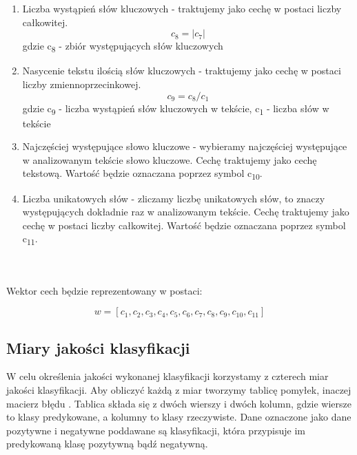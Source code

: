 \documentclass{classrep}
\begin{document}
\begin{enumerate}
  \item Liczba wystąpień słów kluczowych - traktujemy jako cechę w postaci liczby całkowitej.\begin{equation}  c_8 = | c_7 | \end{equation} gdzie c\textsubscript{8} - zbiór występujących słów kluczowych\\
  \item Nasycenie tekstu ilością słów kluczowych - traktujemy jako cechę w postaci liczby zmiennoprzecinkowej.  \begin{equation} c_{9} = c_8 / c_1 \end{equation}  gdzie c\textsubscript{9} - liczba wystąpień słów kluczowych w tekście, c\textsubscript{1} - liczba słów w tekście\\
  \item Najczęściej występujące słowo kluczowe - wybieramy najczęściej występujące w analizowanym tekście słowo kluczowe. Cechę traktujemy jako cechę tekstową. Wartość będzie oznaczana poprzez symbol  c\textsubscript{10}.\\
  \item Liczba unikatowych słów - zliczamy liczbę unikatowych słów, to znaczy występujących dokładnie raz w analizowanym tekście. Cechę traktujemy jako cechę w postaci liczby całkowitej. Wartość będzie oznaczana poprzez symbol  c\textsubscript{11}.\\
\end{enumerate}


\ \\ \\
Wektor cech będzie reprezentowany w postaci: 

\begin{equation} w = [c_1, c_2, c_3, c_4, c_5, c_6, c_7, c_8, c_9, c_{10}, c_{11}] \end{equation}


\subsection{Miary jakości klasyfikacji} 

W celu określenia jakości wykonanej klasyfikacji korzystamy z czterech miar jakości klasyfikacji. Aby obliczyć każdą z miar tworzymy tablicę pomyłek, inaczej macierz błędu \cite{tablica}. Tablica składa się z dwóch wierszy i dwóch kolumn, gdzie wiersze to klasy predykowane, a kolumny to klasy rzeczywiste. Dane oznaczone jako dane pozytywne i negatywne poddawane są klasyfikacji, która przypisuje im predykowaną klasę pozytywną bądź negatywną.\\
\end{document}
